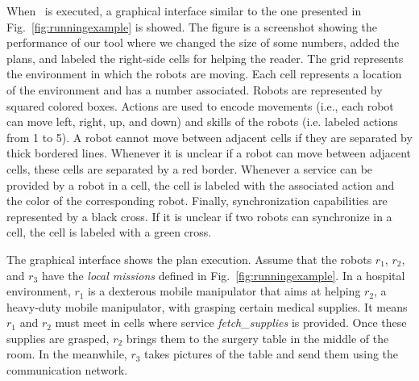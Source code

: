 
When  \toolName\ is executed, a graphical interface similar to the one presented  in Fig.~\ref{fig:runningexample} is showed.
The figure is a screenshot showing the performance of our tool where we changed the size of some numbers, added the plans, and labeled the right-side cells  for helping the reader.
The grid represents the environment in which the robots are moving.
Each cell represents a location of the environment and has a number associated. %
Robots are represented by squared colored boxes.
Actions are used to encode movements (i.e., each robot can move left, right, up, and down) and skills of the robots (i.e. labeled actions from 1 to 5).
A robot  cannot move between adjacent cells if they are separated by thick bordered lines.
Whenever  it is unclear if a robot can move between adjacent cells, these cells are separated by a red border.
Whenever a service can be provided by a robot in a cell, the cell is labeled with the associated action and the color of the corresponding robot.
Finally, synchronization capabilities are represented by a black cross.
If it is unclear if two robots can synchronize in a cell, the cell is labeled with a green cross.

The graphical interface shows the plan execution.
Assume that the robots $r_1$, $r_2$, and $r_3$ have the \emph{local missions} defined in Fig.~\ref{fig:runningexample}.
In a  hospital environment, $r_1$ is a dexterous mobile manipulator that aims at helping $r_2$, a heavy-duty mobile manipulator, with grasping certain medical supplies.
It means $r_1$ and $r_2$ must meet in cells where service \emph{fetch\_supplies} is provided.
Once these supplies are grasped, $r_2$ brings them to the surgery table in the middle of the room.
In the meanwhile, $r_3$ takes pictures of the table and send them using the communication network.



